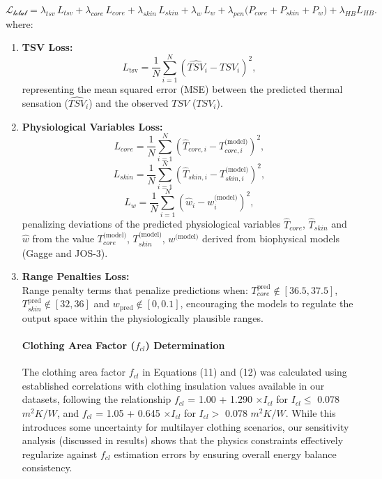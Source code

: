 \begin{equation}
\mathcal{L_\text{total}} = \lambda_{tsv}\, L_{tsv} +  \lambda_{core}\, L_{core} + \lambda_{skin}\, L_{skin} + \lambda_{w}\, L_{w} + \lambda_{pen} \Big( P_{core} + P_{skin} + P_{w} \Big) +  \lambda_{HB} L_{HB}.
\label{eq:total_loss}
\end{equation}
where:
\begin{enumerate}
    \item \textbf{TSV Loss:} \\
    \begin{equation}
    L_{\text{tsv}} = \frac{1}{N} \sum_{i=1}^{N} \left(\widehat{TSV}_i - TSV_i\right)^2,
    \label{eq:tsv_loss}
    \end{equation}
    representing the mean squared error (MSE) between the predicted thermal sensation ($\widehat{TSV}_i$) and the observed $TSV$ ($TSV_i$).
    
    \item \textbf{Physiological Variables Loss:}
    \begin{equation}
    L_{core} = \frac{1}{N} \sum_{i=1}^{N} \left(\widehat{T}_{core,i} - T_{core,i}^{\text{(model)}}\right)^2,
    \label{eq:tcr_loss}
    \end{equation}
\begin{equation}
    L_{skin} = \frac{1}{N} \sum_{i=1}^{N} \left(\widehat{T}_{skin,i} - T_{skin,i}^{\text{(model)}}\right)^2,
    \label{eq:tskin_loss}
    \end{equation}
\begin{equation}
    L_{w} = \frac{1}{N} \sum_{i=1}^{N} \left(\widehat{w}_i - w_i^{\text{(model)}}\right)^2,
    \label{eq:w_loss}
    \end{equation}
    penalizing deviations of the predicted physiological variables $\widehat{T}_{core}$, $\widehat{T}_{skin}$ and $\widehat{w}$ from the value $T_{core}^{\text{(model)}}$, $T_{skin}^{\text{(model)}}$, $w^{\text{(model)}}$ derived from biophysical models (Gagge and JOS-3).
    \item \textbf{Range Penalties Loss:} \\
Range penalty terms that penalize predictions when:
$T_{core}^{\text{pred}} \notin [36.5, 37.5]$,
$T_{skin}^{\text{pred}} \notin [32, 36]$ and
$w_{\text{pred}} \notin [0, 0.1]$, encouraging the models to regulate the output space within the physiologically plausible ranges.

\paragraph{Clothing Area Factor ($f_{cl}$) Determination} The clothing area factor $f_{cl}$ in Equations (11) and (12) was calculated using established correlations with clothing insulation values available in our datasets, following the relationship $f_{cl}$ = 1.00 + 1.290  $\times I_{cl}$ for $I_{cl} \leq$  0.078 $m^2K/W$, and $f_{cl}$ = 1.05 + 0.645  $\times I_{cl}$ for $I_{cl} >$  0.078 $m^2K/W$. While this introduces some uncertainty for multilayer clothing scenarios, our sensitivity analysis (discussed in results) shows that the physics constraints effectively regularize against $f_{cl}$ estimation errors by ensuring overall energy balance consistency.


\end{enumerate}
